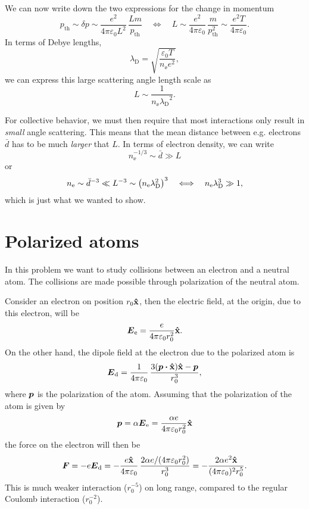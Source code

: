 \documentclass[11pt,a4paper, 
english, swedish %
]{article}
\newcommand{\lD}{\ensuremath{\lambda_{\text{D}}}}
\begin{document}
We can now write down the two expressions for the change in momentum
\begin{equation}
p_\text{th} \sim \delta p \sim 
\frac{e^2}{4\pi\varepsilon_0L^2}\,\frac{Lm}{p_\text{th}}
\quad\Longleftrightarrow\quad
L\sim \frac{e^2}{4\pi\varepsilon_0}\,\frac{m}{p_\text{th}^2}
\sim \frac{e^2T}{4\pi\varepsilon_0}.
\end{equation}
In terms of Debye lengths,
\begin{equation}
\lD = \sqrt{\frac{\varepsilon_0 T}{n_\ee e^2}},
\end{equation}
we can express this large scattering angle length scale as
\begin{equation}
L\sim\frac{1}{n_\ee\lD^2}.
\end{equation}

For collective behavior, we must then require that most interactions
only result in \emph{small} angle scattering. This means that the mean
distance between e.g. electrons $\bar{d}$ has to be much \emph{larger}
that $L$. In terms of electron density, we can write
\begin{equation}
n_\ee^{-1/3}\sim \bar{d} \gg L
\end{equation}
or
\begin{equation}
n_\ee\sim \bar{d}^{-3}\ll L^{-3}
\sim\qty(n_\ee\lD^2)^3
\quad\Longleftrightarrow\quad
n_\ee\lD^3\gg1,
\end{equation}
which is just what we wanted to show. 

\section{Polarized atoms}
In this problem we want to study collisions between an electron and a
neutral atom. The collisions are made possible through polarization of
the neutral atom.

Consider an electron on position $r_0\vu{x}$, then the electric field,
at the origin, due to this electron, will be
\begin{equation}
\vb*E_{\mathrm{e}} = \frac{e}{4\pi\varepsilon_0 r_0^2}\vu{x}.
\end{equation}
On the other hand, the dipole field at the electron due to the
polarized atom is
\begin{equation}
\vb*E_\text{d}=\frac{1}{4\pi\varepsilon_0}\,
\frac{3(\vb*p\vdot\vu{x})\vu{x}-\vb*p}{r_0^3},
\end{equation}
where $\vb*p$ is the polarization of the atom.
Assuming that the polarization of the atom is given by
\begin{equation}
\vb*p = \alpha\vb*E_{\mathrm{e}}
=\frac{\alpha e}{4\pi\varepsilon_0 r_0^2}\vu{x}
\end{equation}
the force on the electron will then be
\begin{equation}
\vb*F=-e\vb*E_\text{d}=-\frac{e \vu{x}}{4\pi\varepsilon_0}\,
\frac{2\alpha e/(4\pi\varepsilon_0r_0^2)}{r_0^3}
=-\frac{2\alpha e^2 \vu{x}}{(4\pi\varepsilon_0)^2r_0^5}.
\end{equation}
This is much weaker interaction ($r_0^{-5}$) on long range, compared
to the regular Coulomb interaction ($r_0^{-2}$).


\end{document}
